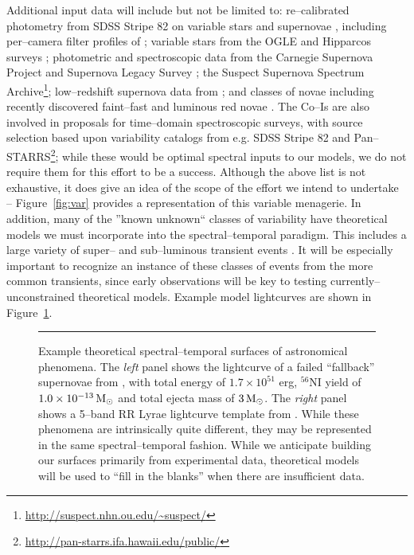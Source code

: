 Additional input data will include but not be limited to: re--calibrated
photometry from SDSS Stripe 82 on variable stars \citep{2010ApJ...708..717S} and
supernovae \citep{2008AJ....136.2306H,2011ApJ...738..162S}, including
per--camera filter profiles of \cite{2007AJ....134..973I}; variable stars from
the OGLE and Hipparcos surveys \citep{2007A&A...475.1159D}; photometric and
spectroscopic data from the Carnegie Supernova Project
\citep[e.g.][]{2010AJ....139..519C} and Supernova Legacy Survey
\citep[e.g.][]{2011yCat..74101262W}; the Suspect Supernova Spectrum
Archive\footnote{\url{http://suspect.nhn.ou.edu/~suspect/}}; low--redshift
supernova data from \cite{2006AJ....131..527J}; and classes of novae including
recently discovered faint--fast \citep{2011ApJ...735...94K} and luminous red
novae \citep{2011ApJ...730..134K}.  The Co--Is are also involved in proposals
for time--domain spectroscopic surveys, with source selection based upon
variability catalogs from e.g. SDSS Stripe 82 and
Pan--STARRS\footnote{\url{http://pan-starrs.ifa.hawaii.edu/public/}}; while
these would be optimal spectral inputs to our models, we do not require them for
this effort to be a success.  Although the above list is not exhaustive, it does
give an idea of the scope of the effort we intend to undertake --
Figure~\ref{fig:var} provides a representation of this variable menagerie. In
addition, many of the ''known unknown`` classes of variability have theoretical
models we must incorporate into the spectral--temporal paradigm.  This includes
a large variety of super-- and sub--luminous transient events
\citep[e.g.][]{2010ApJ...715..767S,2009ApJ...707..193F}.  It will be especially
important to recognize an instance of these classes of events from the more
common transients, since early observations will be key to testing
currently--unconstrained theoretical models.  Example model lightcurves are
shown in Figure~\ref{fig:sts}.

\begin{figure}[t]
\centerline{ \hfil
{}} \smallskip
\caption[]{\footnotesize Example theoretical spectral--temporal surfaces of
astronomical phenomena.  The {\it left} panel shows the lightcurve of a failed
``fallback'' supernovae from \cite{2009ApJ...707..193F}, with total energy of
$1.7 \times 10^{51}$ erg, $^{56}$NI yield of $1.0 \times 10^{-13} {\rm\,M_\odot}$ and
total ejecta mass of $3 {\rm\,M_\odot}$.  The {\it right} panel shows a 5--band RR Lyrae
lightcurve template from \cite{2010ApJ...708..717S}.  While these phenomena are
intrinsically quite different, they may be represented in the same
spectral--temporal fashion.  While we anticipate building our surfaces primarily
from experimental data, theoretical models will be used to ``fill in the
blanks'' when there are insufficient data.} \medskip \hrule \label{fig:sts}
\end{figure}

